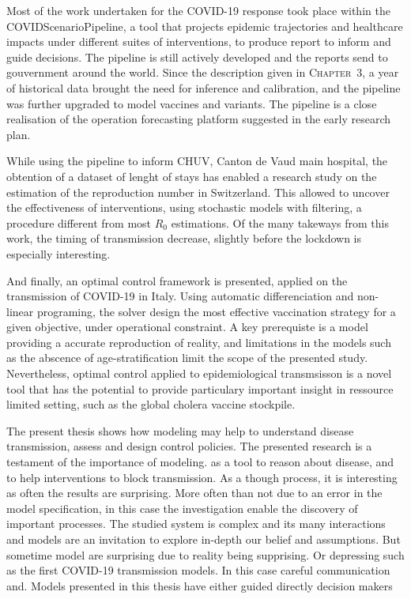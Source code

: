 Most of the work undertaken for the COVID-19 response took place within the COVIDScenarioPipeline, a tool that projects epidemic trajectories and healthcare impacts under different suites of interventions, to produce report to inform and guide decisions. The pipeline is still actively developed and the reports send to gouvernment around the world. Since the description given in \textsc{Chapter~3}, a year of historical data brought the need for inference and calibration, and the pipeline was further upgraded to model vaccines and variants. The pipeline is a close realisation of the operation forecasting platform suggested in the early research plan.

While using the pipeline to inform CHUV, Canton de Vaud main hospital, the obtention of a dataset of lenght of stays has enabled a research study on the estimation of the reproduction number in Switzerland. This allowed to uncover the effectiveness of interventions, using stochastic models with filtering, a procedure different from most $R_0$ estimations. Of the many takeways from this work, the timing of transmission decrease, slightly before the lockdown is especially interesting.

And finally, an optimal control framework is presented, applied on the transmission of COVID-19 in Italy. Using automatic differenciation and non-linear programing, the solver design the most effective vaccination strategy for a given objective, under operational constraint. A key prerequiste is a model providing a accurate reproduction of reality, and limitations in the models such as the abscence of age-stratification limit the scope of the presented study. Nevertheless, optimal control applied to epidemiological transmsisson is a novel tool that has the potential to provide particulary important  insight in ressource limited setting, such as the global cholera vaccine stockpile.

The present thesis shows how modeling may help to understand disease transmission, assess and design control policies.
 The presented research is a testament of the importance of modeling. as a tool to reason about disease, and to help interventions to block transmission. As a though process, it is interesting as often the results are surprising. More often than not due to an error in the model specification, in this case the investigation enable the discovery of important processes. The studied system is complex and its many interactions and models are an invitation to explore in-depth our belief and assumptions. But sometime model are surprising due to reality being supprising. Or depressing such as the first COVID-19 transmission models. In this case careful communication and. Models presented in this thesis have either guided directly decision makers
 
